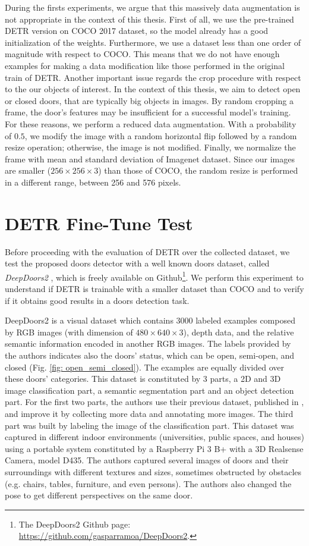 During the firsts experiments, we argue that this massively data augmentation is not appropriate in the context of this thesis. First of all, we use the pre-trained DETR version on COCO 2017 dataset, so the model already has a good initialization of the weights. Furthermore, we use a dataset less than one order of magnitude with respect to COCO. This means that we do not have enough examples for making a data modification like those performed in the original train of DETR. Another important issue regards the crop procedure with respect to the our objects of interest. In the context of this thesis, we aim to detect open or closed doors, that are typically big objects in images. By random cropping a frame, the door's features may be insufficient for a successful model's training. For these reasons, we perform a reduced data augmentation. With a probability of $0.5$, we modify the image with a random horizontal flip followed by a random resize operation; otherwise, the image is not modified. Finally, we normalize the frame with mean and standard deviation of Imagenet dataset. Since our images are smaller ($256 \times 256 \times 3$) than those of COCO, the random resize is performed in a different range, between 256 and 576 pixels. 

\section{DETR Fine-Tune Test}

Before proceeding with the evaluation of DETR over the collected dataset, we test the proposed doors detector with a well known doors dataset, called \textit{DeepDoors2} \cite{deepdoors2}, which is freely available on Github\footnote{The DeepDoors2 Github page: \url{https://github.com/gasparramoa/DeepDoors2}.}. We perform this experiment to understand if DETR is trainable with a smaller dataset than COCO and to verify if it obtains good results in a doors detection task. 

DeepDoors2 is a visual dataset which contains 3000 labeled examples composed by  RGB images (with dimension of $480 \times 640 \times 3$), depth data, and the relative semantic information encoded in another RGB images. The labels provided by the authors indicates also the doors' status, which can be open, semi-open, and closed (Fig. \ref{fig: open_semi_closed}). The examples are equally divided over these doors' categories.  This dataset is constituted by 3 parts, a 2D and 3D image classification part, a semantic segmentation part and an object detection part. For the first two parts, the authors use their previous
dataset, published in \cite{deepdoors1}, and improve it by collecting more data and annotating more images. The third part was built by labeling the image of the classification part. This dataset was captured in different indoor environments (universities, public spaces, and houses) using a portable system constituted by a Raspberry Pi 3 B+ with a 3D Realsense Camera, model D435. The authors captured several images of doors and their surroundings with different textures and sizes, sometimes obstructed by obstacles (e.g. chairs, tables, furniture, and even persons). The authors also changed the pose to get different perspectives on the same door. 

